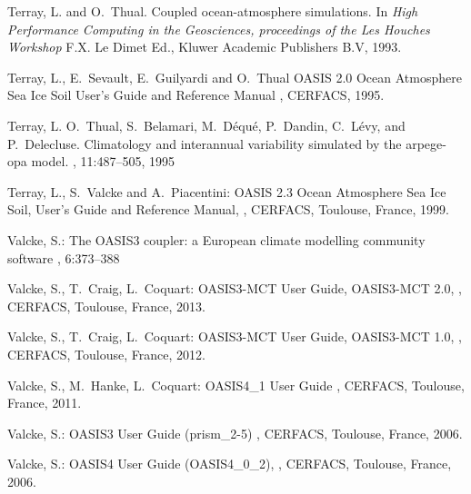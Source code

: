 \begin{thebibliography}{10}
Terray, L. and O.~Thual.
\newblock Coupled ocean-atmosphere simulations. 
\newblock In {\em High Performance Computing in the Geosciences,
proceedings of the Les Houches Workshop}
\newblock F.X. Le Dimet Ed., Kluwer Academic Publishers B.V, 1993.

Terray, L., E.~Sevault, E.~Guilyardi and O.~Thual
\newblock OASIS 2.0 Ocean Atmosphere Sea Ice Soil User's Guide and Reference Manual
, CERFACS, 1995.

Terray, L. O.~Thual, S.~Belamari, M.~D\'equ\'e, P.~Dandin, C.~L\'evy, and
P.~Delecluse. 
\newblock Climatology and interannual variability simulated by the arpege-opa
model. 
, 11:487--505, 1995

Terray, L., S.~Valcke and A.~Piacentini:
\newblock OASIS 2.3 Ocean Atmosphere Sea Ice Soil, User's Guide and
Reference Manual,
, 
\newblock CERFACS, Toulouse, France, 1999.

Valcke, S.: 
\newblock The OASIS3 coupler: a European climate modelling community software
, 6:373--388

Valcke, S., T.~Craig, L.~Coquart: 
\newblock OASIS3-MCT User Guide, OASIS3-MCT 2.0, 
,  
\newblock CERFACS, Toulouse, France, 2013.

Valcke, S., T.~Craig, L.~Coquart: 
\newblock OASIS3-MCT User Guide, OASIS3-MCT 1.0, 
,  
\newblock CERFACS, Toulouse, France, 2012.

Valcke, S., M.~Hanke, L.~Coquart:
\newblock OASIS4\_1 User Guide
, 
\newblock CERFACS, Toulouse, France, 2011. 

Valcke, S.: 
\newblock OASIS3 User Guide (prism\_2-5) 
, 
\newblock CERFACS, Toulouse, France, 2006. 

Valcke, S.: 
\newblock OASIS4 User Guide (OASIS4\_0\_2), 
, 
\newblock CERFACS, Toulouse, France, 2006. 


\end{thebibliography}
